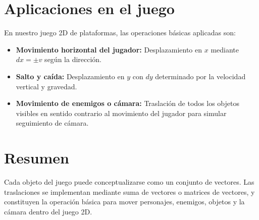 \documentclass[12pt]{article}
\begin{document}
\section*{Aplicaciones en el juego}
En nuestro juego 2D de plataformas, las operaciones básicas aplicadas son:
\begin{itemize}
\item \textbf{Movimiento horizontal del jugador:} Desplazamiento en $x$ mediante $dx = \pm v$ según la dirección.
\item \textbf{Salto y caída:} Desplazamiento en $y$ con $dy$ determinado por la velocidad vertical y gravedad.
\item \textbf{Movimiento de enemigos o cámara:} Traslación de todos los objetos visibles en sentido contrario al movimiento del jugador para simular seguimiento de cámara.
\end{itemize}

\section*{Resumen}
Cada objeto del juego puede conceptualizarse como un conjunto de vectores. Las traslaciones se implementan mediante suma de vectores o matrices de vectores, y constituyen la operación básica para mover personajes, enemigos, objetos y la cámara dentro del juego 2D.
\end{document}
